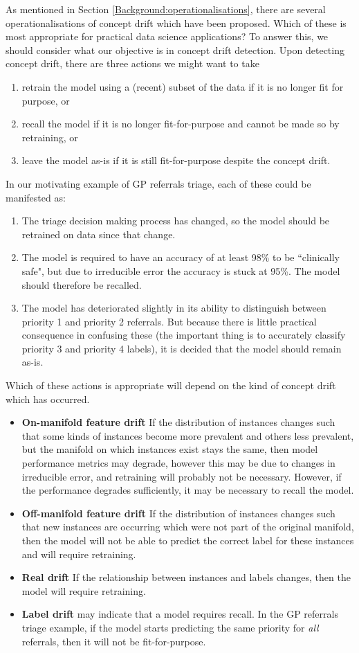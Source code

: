 As mentioned in Section \ref{Background:operationalisations}, there are several operationalisations of concept drift which have been proposed. Which of these is most appropriate for practical data science applications? To answer this, we should consider what our objective is in concept drift detection. Upon detecting concept drift, there are three actions we might want to take
\begin{enumerate}
  \item retrain the model using a (recent) subset of the data if it is no longer fit for purpose, or
  \item recall the model if it is no longer fit-for-purpose and cannot be made so by retraining, or
  \item leave the model as-is if it is still fit-for-purpose despite the concept drift.
\end{enumerate}
In our motivating example of GP referrals triage, each of these could be manifested as:
\begin{enumerate}
  \item The triage decision making process has changed, so the model should be retrained on data since that change.
  \item The model is required to have an accuracy of at least 98\% to be ``clinically safe", but due to irreducible error the accuracy is stuck at 95\%. The model should therefore be recalled.
  \item The model has deteriorated slightly in its ability to distinguish between priority 1 and priority 2 referrals. But because there is little practical consequence in confusing these (the important thing is to accurately classify priority 3 and priority 4 labels), it is decided that the model should remain as-is.
\end{enumerate}
Which of these actions is appropriate will depend on the kind of concept drift which has occurred.
\begin{itemize}
  \item {\bf On-manifold feature drift} If the distribution of instances changes such that some kinds of instances become more prevalent and others less prevalent, but the manifold on which instances exist stays the same, then model performance metrics may degrade, however this may be due to changes in irreducible error, and retraining will probably not be necessary. However, if the performance degrades sufficiently, it may be necessary to recall the model.
  \item {\bf Off-manifold feature drift} If the distribution of instances changes such that new instances are occurring which were not part of the original manifold, then the model will not be able to predict the correct label for these instances and will require retraining.
  \item {\bf Real drift} If the relationship between instances and labels changes, then the model will require retraining.
  \item {\bf Label drift} may indicate that a model requires recall. In the GP referrals triage example, if the model starts predicting the same priority for {\it all} referrals, then it will not be fit-for-purpose.
\end{itemize}
